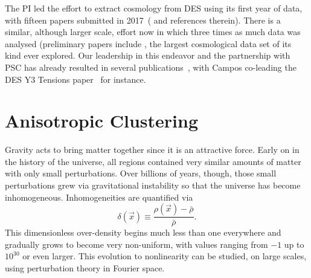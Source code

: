 \documentclass[12pt]{article}
\newcommand\be{\begin{equation}}
\def\ee{\end{equation}}
\begin{document}
\begin{small}
The PI led the effort to extract cosmology from DES using its first year of data, with fifteen papers submitted in 2017~(\cite{Abbott:2017wau} and references therein). There is a similar, although larger scale, effort now in which three times as much data was analysed (preliminary papers include , the largest cosmological data set of its kind ever explored. Our leadership in this endeavor and the partnership with PSC has already resulted in several publications~\cite{Hartley:2020euq,Lemos:2020jry,MacCrann:2020yhw,Friedrich:2020dqo,Myles:2020dyq}, with Campos co-leading the DES Y3 Tensions paper~\cite{y3-tensions} for instance. 
%

\section{Anisotropic Clustering}

Gravity acts to bring matter together since it is an attractive force. Early on in the history of the universe, all regions contained very similar amounts of matter with only small perturbations. Over billions of years, though, those small perturbations grew via gravitational instability so that the universe has become inhomogeneous. Inhomogeneities are quantified via
\be
\delta(\vec x) \equiv \frac{\rho(\vec x) - \bar\rho}{\bar\rho}.\ee
This dimensionless over-density begins much less than one everywhere and gradually grows to become very non-uniform, with values ranging from $-1$ up to $10^{30}$ or even larger. This evolution to nonlinearity can be studied, on large scales, using perturbation theory in Fourier space.


\end{small}
\end{document}
